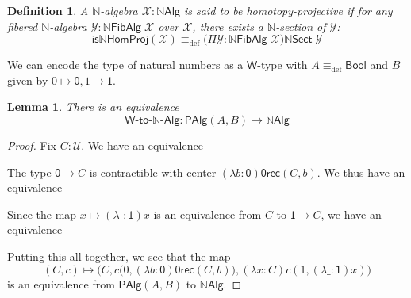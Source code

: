 \documentclass[reqno,10pt,a4paper,oneside]{amsart}
\numberwithin{equation}{section}
\theoremstyle{mythm}
\newtheorem{lemma}[theorem]{Lemma}
\theoremstyle{mydef}
\newtheorem{definition}[theorem]{Definition}
\theoremstyle{myrmk}
\newcommand{\deq}{\equiv}
\newcommand{\defeq}{\deq_{\mathrm{def}}}
\newcommand{\U}{\mathcal{U}}
\newcommand{\prd}[1]{\Pi_{#1}}
\newcommand{\abort}{\mathsf{0rec}}
\newcommand{\nat}{\ensuremath{\mathbb{N}}}
\newcommand{\W}{\mathsf{W}}
\newcommand{\Bool}{\mathsf{Bool}}
\newcommand{\one}{\mathsf{1}}
\newcommand{\zero}{\mathsf{0}}
\newcommand{\NatAlg}{\nat\mathsf{Alg}}
\newcommand{\NatFibAlg}{\nat\mathsf{FibAlg}}
\newcommand{\NatFibHom}{\nat\mathsf{Sect}}
\newcommand{\IsNatHProj}{\mathsf{is}\nat\mathsf{HomProj}}
\newcommand{\WAlgToNatAlg}{\W\text{-}\mathsf{to}\text{-}\nat\text{-}\mathsf{Alg}}
\newcommand{\WAlg}{\mathsf{PAlg}}
\newcommand{\X}{\mathcal{X}}
\newcommand{\Y}{\mathcal{Y}}
\begin{document}
\begin{definition}\label{def:NatHProj}
A $\nat$-algebra $\X : \NatAlg$ is said to be \emph{homotopy-projective} if for any fibered $\nat$-algebra $\Y : \NatFibAlg \; \X$ over $\X$, there exists a $\nat$-section of $\Y$:
\[ \IsNatHProj(\X) \defeq \big(\Pi \Y:\NatFibAlg \; \X\big) \NatFibHom \; \Y \]  
\end{definition}

We can encode the type of natural numbers as a $\W$-type with $A \defeq \Bool$ and $B$ given by $0 \mapsto \zero, 1 \mapsto \one$. 
\begin{lemma}
There is an equivalence
\[ \WAlgToNatAlg : \WAlg(A,B) \to \NatAlg \]
\end{lemma}
\begin{proof}
Fix $C : \U$. We have an equivalence
\begin{center}
\end{center}
The type $\zero \to C$ is contractible with center $(\lambda b:\zero) \abort(C,b)$. We thus have an equivalence
\begin{center}
\end{center}
Since the map $x \mapsto (\lambda \_:\one)x$ is an equivalence from $C$ to $\one \to C$, we have an equivalence
\begin{center}
\end{center}
Putting this all together, we see that the map 
\[ (C,c) \mapsto \Big(C,c\big(0,(\lambda b:\zero) \abort(C,b)\big),(\lambda x:C) c(1, (\lambda \_:\one)x)\Big)\] 
is an equivalence from $\WAlg(A,B)$ to $\NatAlg$.
\end{proof}
\end{document}
